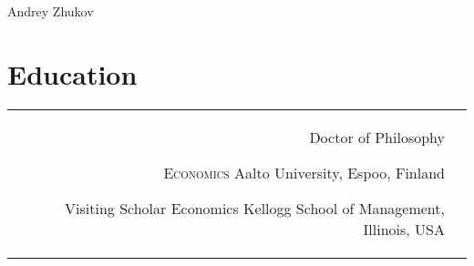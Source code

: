 \documentclass[10pt]{article} %
\begin{document}
\begin{paracol}{2} %


\parbox[top][0.12\textheight][c]{\linewidth}{ %
	\vspace{-0.04\textheight} %
	\centering %
	{\sffamily\Huge Andrey Zhukov}\\\medskip %

}


\section{Education} 





\begin{supertabular}{rl} %

	
	{Doctor of Philosophy}
	{}
	{}
	{}
	
	
	\educationentry{}
	{{\normalfont \textsc{\small{Economics}}}} %
	{} %
	{} %
	{Aalto University, Espoo, Finland}
	
	
	
	{Visiting Scholar} %
	{Economics} %
	{}
	{Kellogg School of Management, Illinois, USA}
	

\end{supertabular}
\end{paracol}
\end{document}
